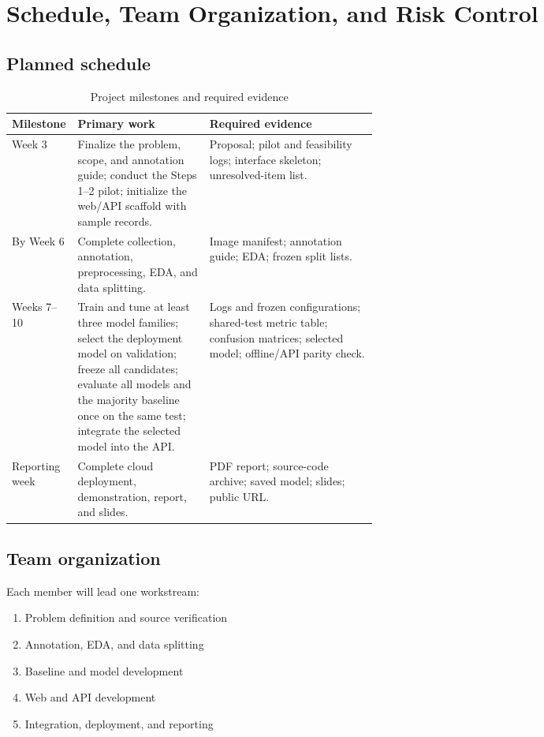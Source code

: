 \newpage
\section{Schedule, Team Organization, and Risk Control}

\subsection{Planned schedule}

\begin{table}[H]
\centering
\caption{Project milestones and required evidence}
\label{tab:schedule}
\begin{tabularx}{\textwidth}{>{\raggedright\arraybackslash}p{0.18\linewidth}>{\raggedright\arraybackslash}p{0.36\linewidth}L}
\toprule
\textbf{Milestone} & \textbf{Primary work} & \textbf{Required evidence} \\
\midrule
Week 3 &
Finalize the problem, scope, and annotation guide; conduct the Steps 1--2 pilot; initialize the web/API scaffold with sample records. &
Proposal; pilot and feasibility logs; interface skeleton; unresolved-item list. \\
By Week 6 &
Complete collection, annotation, preprocessing, EDA, and data splitting. &
Image manifest; annotation guide; EDA; frozen split lists. \\
Weeks 7--10 &
Train and tune at least three model families; select the deployment model on validation; freeze all candidates; evaluate all models and the majority baseline once on the same test; integrate the selected model into the API. &
Logs and frozen configurations; shared-test metric table; confusion matrices; selected model; offline/API parity check. \\
Reporting week &
Complete cloud deployment, demonstration, report, and slides. &
PDF report; source-code archive; saved model; slides; public URL. \\
\bottomrule
\end{tabularx}
\end{table}

\subsection{Team organization}

Each member will lead one workstream:
\begin{enumerate}
  \item Problem definition and source verification
  \item Annotation, EDA, and data splitting
  \item Baseline and model development
  \item Web and API development
  \item Integration, deployment, and reporting
\end{enumerate}

